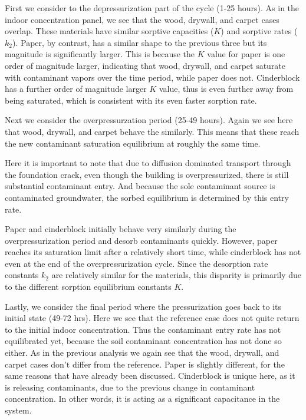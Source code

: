 First we consider to the depressurization part of the cycle (1-25 hours).
As in the indoor concentration panel, we see that the wood, drywall, and carpet cases overlap.
These materials have similar sorptive capacities ($K$) and sorptive rates ($k_2$).
Paper, by contrast, has a similar shape to the previous three but its magnitude is significantly larger.
This is because the $K$ value for paper is one order of magnitude larger, indicating that wood, drywall, and carpet saturate with contaminant vapors over the time period, while paper does not.
Cinderblock has a further order of magnitude larger $K$ value, thus is even further away from being saturated, which is consistent with its even faster sorption rate.\par

Next we consider the overpressurzation period (25-49 hours).
Again we see here that wood, drywall, and carpet behave the similarly.
This means that these reach the new contaminant saturation equilibrium at roughly the same time.\par

Here it is important to note that due to diffusion dominated transport through the foundation crack, even though the building is overpressurized, there is still substantial contaminant entry.
And because the sole contaminant source is contaminated groundwater, the sorbed equilibrium is determined by this entry rate.\par

Paper and cinderblock initially behave very similarly during the overpressurization period and desorb contaminants quickly.
However, paper reaches its saturation limit after a relatively short time, while cinderblock has not even at the end of the overpressurization cycle.
Since the desorption rate constants $k_2$ are relatively similar for the materials, this disparity is primarily due to the different sorption equilibrium constants $K$.\par

Lastly, we consider the final period where the pressurization goes back to its initial state (49-72 hrs).
Here we see that the reference case does not quite return to the initial indoor concentration.
Thus the contaminant entry rate has not equilibrated yet, because the soil contaminant concentration has not done so either.
As in the previous analysis we again see that the wood, drywall, and carpet cases don't differ from the reference.
Paper is slightly different, for the same reasons that have already been discussed.
Cinderblock is unique here, as it is releasing contaminants, due to the previous change in contaminant concentration.
In other words, it is acting as a significant capacitance in the system.\par

